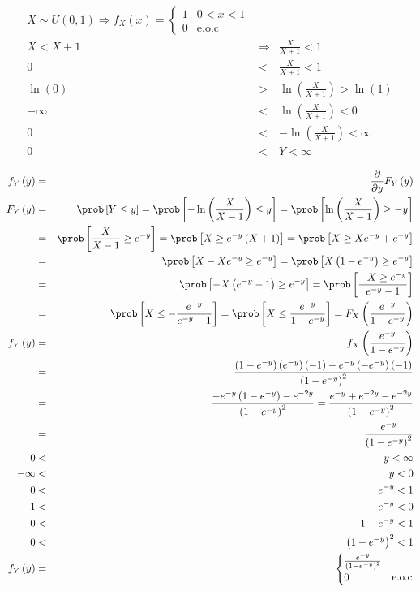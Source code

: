 \begin{enumerate}
\begin{eqnarray*}
X \sim U\left(0,1 \right) \Rightarrow f_{X}\left(x \right) =  \begin{cases}
1 & 0 < x < 1\\
0 & \textrm{e.o.c}
\end{cases}\\
X< X+1 &\Rightarrow & \frac{X}{X+1} < 1\\
0 &<& \frac{X}{X+1} < 1\\
\ln \left( 0 \right) &>& \ln \left( \frac{X}{X+1} \right) > \ln \left(1 \right)\\
- \infty &<& \ln \left(\frac{X}{X+1}\right)< 0\\
0 &<& -\ln \left(\frac{X}{X+1} \right) < \infty\\
0 &<& Y < \infty
\end{eqnarray*}

\begin{eqnarray*}
f_{Y} \left(y \right)&=& \frac{\partial}{\partial y} F_{Y} \left(y \right)\\
F_{Y}\left(y \right) &=& \prob \left[ Y \leq y \right]= \prob \left[-\ln \left( \frac{X}{X-1} \right) \leq y \right] = \prob \left[ \ln \left( \frac{X}{X-1} \right) \geq -y \right]\\
&=& \prob \left[ \frac{X}{X-1} \geq e^{-y} \right] = \prob \left[ X \geq e^{-y} \left( X+1 \right)\right] = \prob \left[X \geq X e^{-y} + e^{-y}\right]\\
&=& \prob \left[ X - Xe^{-y} \geq e^{-y} \right] = \prob \left[X \left(1-e^{-y} \right) \geq e^{-y} \right]\\
&=& \prob \left[ -X \left( e^{-y}-1 \right) \geq e^{-y} \right] = \prob \left[ \frac{-X \geq e^{-y}}{e^{-y}-1} \right]\\
&=& \prob  \left[ X \leq - \frac{e^{-y}}{e^{-y}-1} \right] = \prob \left[X \leq \frac{e^{-y}}{1-e^{-y}} \right] = F_{X} \left( \frac{e^{-y}}{1-e^{-y}} \right)\\
f_{Y}\left(y \right) &=& f_{X} \left( \frac{e^{-y}}{1-e^{-y}} \right)\\
&=& \frac{\left(1-e^{-y} \right)\left(e^{-y} \right) \left( -1 \right) - e^{-y} \left(-e^{-y} \right) \left( -1\right) }{\left( 1 - e ^{-y} \right)^2}\\
&=& \frac{-e^{-y}\left( 1- e ^{-y} \right)- e ^{-2y}}{\left(1-e^{-y} \right)^2} = \frac{e^{-y}+ e ^{-2y}- e^{-2y}}{\left(1-e^{-y} \right)^2}\\
&=& \frac{e^{-y}}{\left( 1-e^{-y} \right)^2}\\
0&<&y<\infty\\
-\infty &<& y < 0\\
 0&<& e^{-y} < 1\\
 -1&<& -e^{-y}< 0\\
 0&<& 1-e^{-y}< 1\\
 0&<& \left(1-e^{-y} \right)^2 < 1\\
 f_{Y}\left(y \right) &=&  \begin{cases}
\frac{e^{-y}}{\left(1-e^{-y} \right)^2} & \\
0 & \textrm{e.o.c}
\end{cases}\\
\end{eqnarray*}


\end{enumerate}
